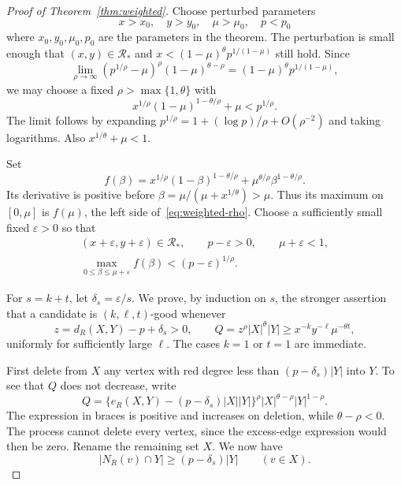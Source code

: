 \documentclass[11pt]{article}
\theoremstyle{definition}
\theoremstyle{remark}
\newcommand{\RR}{\mathcal R}
\numberwithin{equation}{section}
\begin{document}
\begin{proof}[Proof of Theorem~\ref{thm:weighted}]
Choose perturbed parameters
\[
 x>x_0,\quad y>y_0,\quad \mu>\mu_0,\quad p<p_0
\]
where $x_0,y_0,\mu_0,p_0$ are the parameters in the theorem. The perturbation is small enough that $(x,y)\in\RR_*$ and $x<(1-\mu)^\theta p^{1/(1-\mu)}$ still hold. Since
\[
 \lim_{\rho\to\infty}(p^{1/\rho}-\mu)^\rho(1-\mu)^{\theta-\rho}
 =(1-\mu)^\theta p^{1/(1-\mu)},
\]
we may choose a fixed $\rho>\max\{1,\theta\}$ with
\begin{equation}\label{eq:weighted-rho}
 x^{1/\rho}(1-\mu)^{1-\theta/\rho}+\mu<p^{1/\rho}.
\end{equation}
The limit follows by expanding $p^{1/\rho}=1+(\log p)/\rho+O(\rho^{-2})$ and taking logarithms. Also $x^{1/\theta}+\mu<1$.

Set
\[
 f(\beta)=x^{1/\rho}(1-\beta)^{1-\theta/\rho}
       +\mu^{\theta/\rho}\beta^{1-\theta/\rho}.
\]
Its derivative is positive before $\beta=\mu/(\mu+x^{1/\theta})>\mu$. Thus its maximum on $[0,\mu]$ is $f(\mu)$, the left side of~\eqref{eq:weighted-rho}. Choose a sufficiently small fixed $\varepsilon>0$ so that
\begin{equation}\label{eq:weighted-epsilon}
 \begin{gathered}
 (x+\varepsilon,y+\varepsilon)\in\RR_*,\qquad
 p-\varepsilon>0,\qquad \mu+\varepsilon<1,\\
 \max_{0\le\beta\le\mu+\varepsilon}f(\beta)<(p-\varepsilon)^{1/\rho}.
 \end{gathered}
\end{equation}

For $s=k+t$, let $\delta_s=\varepsilon/s$. We prove, by induction on $s$, the stronger assertion that a candidate is $(k,\ell,t)$-good whenever
\begin{equation}\label{eq:weighted-induction}
 z=d_R(X,Y)-p+\delta_s>0,\qquad
 Q=z^\rho|X|^\theta|Y|\ge x^{-k}y^{-\ell}\mu^{-\theta t},
\end{equation}
uniformly for sufficiently large $\ell$. The cases $k=1$ or $t=1$ are immediate.

First delete from $X$ any vertex with red degree less than $(p-\delta_s)|Y|$ into $Y$. To see that $Q$ does not decrease, write
\[
 Q=\{e_R(X,Y)-(p-\delta_s)|X||Y|\}^\rho
       |X|^{\theta-\rho}|Y|^{1-\rho}.
\]
The expression in braces is positive and increases on deletion, while $\theta-\rho<0$. The process cannot delete every vertex, since the excess-edge expression would then be zero. Rename the remaining set $X$. We now have
\begin{equation}\label{eq:weighted-row-floor}
 |N_R(v)\cap Y|\ge(p-\delta_s)|Y|\qquad(v\in X).
\end{equation}


\end{proof}
\end{document}
